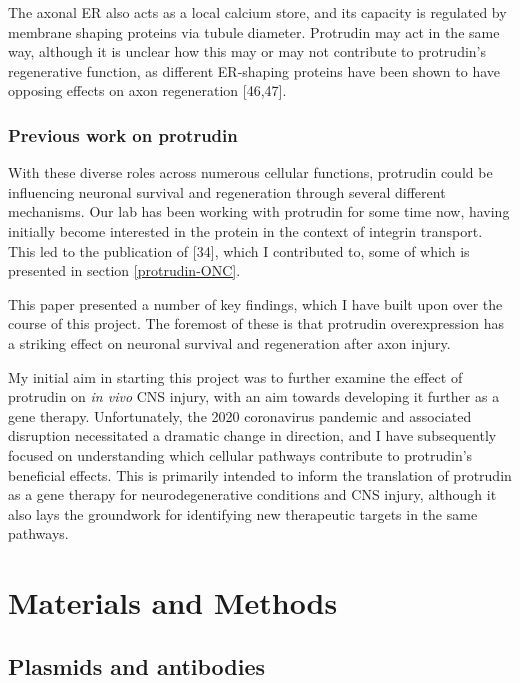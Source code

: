 \documentclass[
  12pt,
  a4paper,
]{book}
\begin{document}
The axonal ER also acts as a local calcium store, and its capacity is regulated by membrane shaping proteins via tubule diameter. Protrudin may act in the same way, although it is unclear how this may or may not contribute to protrudin's regenerative function, as different ER-shaping proteins have been shown to have opposing effects on axon regeneration {[}46,47{]}.

\hypertarget{previous-work-on-protrudin}{%
\subsection{Previous work on protrudin}\label{previous-work-on-protrudin}}

With these diverse roles across numerous cellular functions, protrudin could be influencing neuronal survival and regeneration through several different mechanisms. Our lab has been working with protrudin for some time now, having initially become interested in the protein in the context of integrin transport. This led to the publication of {[}34{]}, which I contributed to, some of which is presented in section \ref{protrudin-ONC}.

This paper presented a number of key findings, which I have built upon over the course of this project. The foremost of these is that protrudin overexpression has a striking effect on neuronal survival and regeneration after axon injury.

My initial aim in starting this project was to further examine the effect of protrudin on \emph{in vivo} CNS injury, with an aim towards developing it further as a gene therapy. Unfortunately, the 2020 coronavirus pandemic and associated disruption necessitated a dramatic change in direction, and I have subsequently focused on understanding which cellular pathways contribute to protrudin's beneficial effects. This is primarily intended to inform the translation of protrudin as a gene therapy for neurodegenerative conditions and CNS injury, although it also lays the groundwork for identifying new therapeutic targets in the same pathways.

\hypertarget{METHODS}{%
\chapter*{Materials and Methods}\label{METHODS}}


\hypertarget{plasmids-and-antibodies}{%
\section{Plasmids and antibodies}\label{plasmids-and-antibodies}}
\end{document}

